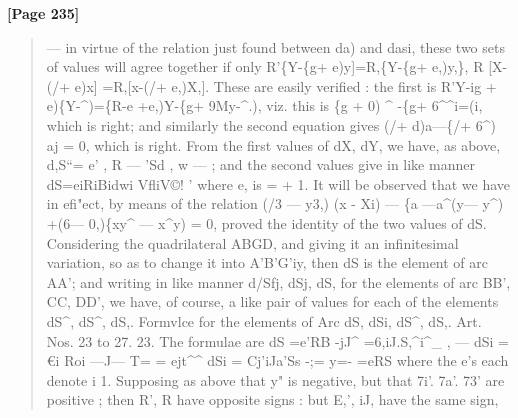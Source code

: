 \documentclass[11pt,a4paper]{book}
\begin{document}
\textbf{[Page 235]}\\[0.2cm]
\begin{quote}
---
in virtue of the relation just found between da) and dasi, these two sets of values will
agree together if only
R'\{Y-\{g+ e)y]=R,\{Y-\{g+
e,)y,\},
R [X-(/+
e)x]
=R,[x-(/+
e,)X,].
These are easily verified : the first is
R'Y-ig + e)\{Y-\textasciicircum{})=\{R-e +e,)Y-\{g+ 9My-\textasciicircum{}.),
viz. this is \{g + 0) \textasciicircum{} -\{g+ 6\textasciicircum{}\textasciicircum{}i=(i, which is right; and similarly the second equation
gives (/+ d)a---\{/+ 6\textasciicircum{}) aj = 0, which is right.
From the first values of dX, dY, we have, as above,
d,S``= e'
,
R
---
'Sd
,
w
---
;
and the second values give in like manner
dS=eiRiBidwi
VfliV©!
'
where e, is = + 1. It will be observed that we have in efi"ect, by means of the relation
(/3 --- y3,) (x - Xi) --- \{a ---a\textasciicircum{}(y--- y\textasciicircum{}) +(6--- 0,)\{xy\textasciicircum{} --- x\textasciicircum{}y) = 0, proved the identity of the two
values of dS.
Considering the quadrilateral ABGD, and giving it an infinitesimal variation, so as to
change it into A'B'G'iy, then dS is the element of arc AA'; and writing in like manner
d/Sfj, dSj, dS, for the elements of arc BB', CC, DD', we have, of course, a like pair of
values for each of the elements dS\textasciicircum{}, dS\textasciicircum{}, dS,.
Formvlce for the elements of Arc dS, dSi, dS\textasciicircum{}, dS,. Art. Nos. 23 to 27.
23. The formulae are
dS =e'RB -jJ\textasciicircum{} =6,iJ.S,\textasciicircum{}i\textasciicircum{}\_
,
---
dSi = €i Roi ---J--- T= = ejt\textasciicircum{}\textasciicircum{}
dSi = Cj'iJa'Ss -;= y=- =eRS
where the e's each denote i 1. Supposing as above that y" is negative, but that
7i'. 7a'. 73' are positive ; then R', R have opposite signs : but E,', iJ, have the same sign,
\end{quote}
\end{document}
